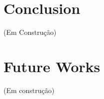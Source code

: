 \documentclass{vgtc}
\begin{document}
    \section{Conclusion}\label{conclusion}

(Em Construção)

    \section{Future Works}\label{future-works}

(Em construção)








    
\end{document}
